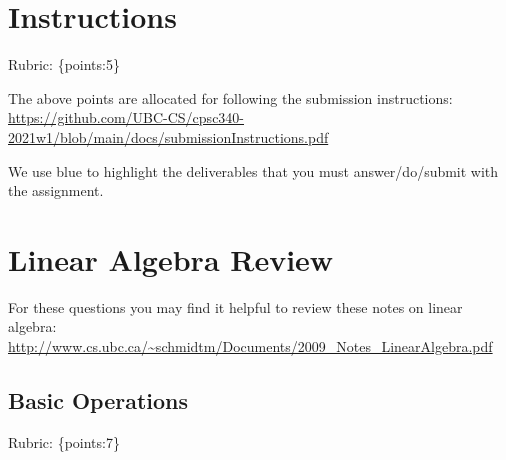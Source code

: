 \documentclass{article}
\def\rubric#1{\gre{Rubric: \{#1\}}}{}
\def\blu#1{{\color{blu}#1}}
\def\gre#1{{\color{gre}#1}}
\begin{document}
	\section*{Instructions}
	\rubric{points:5}

		The above points are allocated for following the submission instructions: \\\url{https://github.com/UBC-CS/cpsc340-2021w1/blob/main/docs/submissionInstructions.pdf}

	\vspace{1em}
	We use \blu{blue} to highlight the deliverables that you must answer/do/submit with the assignment.

	\section{Linear Algebra Review}

	For these questions you may find it helpful to review these notes on linear algebra:\\
	\url{http://www.cs.ubc.ca/~schmidtm/Documents/2009_Notes_LinearAlgebra.pdf}

	\subsection{Basic Operations}
	\rubric{points:7}
\end{document}
